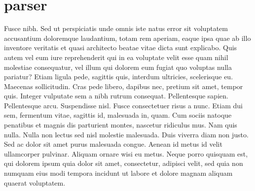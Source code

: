 \section{parser}
Fusce nibh. Sed ut perspiciatis unde omnis iste natus error sit voluptatem accusantium doloremque laudantium, totam rem aperiam, eaque ipsa quae ab illo inventore veritatis et quasi architecto 
beatae vitae dicta sunt explicabo. Quis autem vel eum iure reprehenderit qui in ea voluptate velit esse quam nihil molestiae consequatur, vel illum qui dolorem eum fugiat quo voluptas nulla pariatur? Etiam ligula pede, sagittis quis, interdum ultricies, scelerisque eu. Maecenas sollicitudin. Cras pede libero, dapibus nec, pretium sit amet, tempor quis. Integer vulputate sem a nibh rutrum consequat. Pellentesque sapien. Pellentesque arcu. Suspendisse nisl. Fusce consectetuer risus a nunc. Etiam dui sem, fermentum vitae, sagittis id, malesuada in, quam. Cum sociis natoque penatibus et magnis dis parturient montes, nascetur ridiculus mus. Nam quis nulla. Nulla non lectus sed nisl molestie malesuada. Duis viverra diam non justo. Sed ac dolor sit amet purus malesuada congue. Aenean id metus id velit ullamcorper pulvinar. Aliquam ornare wisi eu metus. Neque porro quisquam est, qui dolorem ipsum quia dolor sit amet, consectetur, adipisci velit, sed quia non numquam eius modi tempora incidunt ut labore et dolore magnam aliquam quaerat voluptatem.

\endinput
